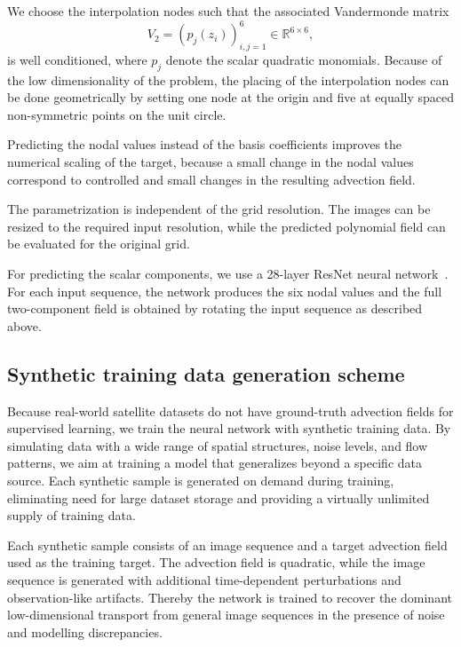 \documentclass[a4paper,12pt]{article}
\begin{document}
We choose the interpolation nodes such that the associated Vandermonde matrix
\begin{equation}
    V_2 = (p_j(z_i))_{i,j=1}^{6} \in \mathbb{R}^{6 \times 6},
\end{equation}
is well conditioned, where $p_j$ denote the scalar quadratic monomials.
Because of the low dimensionality of the problem, the placing of the interpolation nodes can be done geometrically by setting one node at the origin and five at equally spaced non-symmetric points on the unit circle.

Predicting the nodal values instead of the basis coefficients improves the numerical scaling of the target, because a small change in the nodal values correspond to controlled and small changes in the resulting advection field.

The parametrization is independent of the grid resolution.
The images can be resized to the required input resolution, while the predicted polynomial field can be evaluated for the original grid.


For predicting the scalar components, we use a 28-layer ResNet neural network~\cite{resnet}.
For each input sequence, the network produces the six nodal values and the full two-component field is obtained by rotating the input sequence as described above.

\subsection{Synthetic training data generation scheme}
Because real-world satellite datasets do not have ground-truth advection fields for supervised learning, we train the neural network with synthetic training data.
By simulating data with a wide range of spatial structures, noise levels, and flow patterns, we aim at training a model that generalizes beyond a specific data source.
Each synthetic sample is generated on demand during training, eliminating need for large dataset storage and providing a virtually unlimited supply of training data.

Each synthetic sample consists of an image sequence and a target advection field used as the training target.
The advection field is quadratic, while the image sequence is generated with additional time-dependent perturbations and observation-like artifacts.
Thereby the network is trained to recover the dominant low-dimensional transport from general image sequences in the presence of noise and modelling discrepancies.
\end{document}
